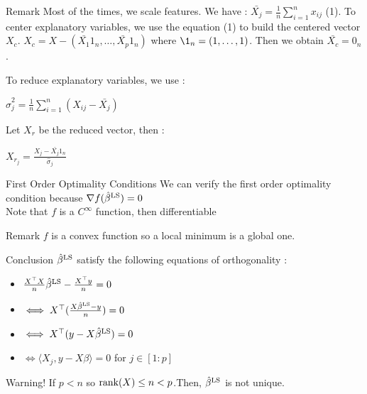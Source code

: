 \documentclass[unknownkeysallowed]{beamer}
\begin{document}
\begin{block}{Remark}
Most of the times, we scale features.
\newline
We have : $\bar{X_{j}}=\frac{1}{n} \sum\limits_{i=1}^{n} x_{ij}$ (1).
\newline
 To center explanatory variables, we use the equation (1) to build the centered vector $X_{c}$.
\newline
$X_{c} = X - (\bar{X_{1}}1_n,\dots,\bar{X_{p}}1_n)$ where $\1_n=(1,\dots,1)$.
Then we obtain $\bar{X_{c}}=0_n$.

To reduce explanatory variables, we use :
\newline
\begin{center}
$\hat\sigma_{j}^2=\frac{1}{n} \sum\limits_{i=1}^{n} (X_{ij}-\bar{X_{j}})$
\end{center}
Let $X_r$ be the reduced vector, then :
\newline
\begin{center}
$X_{r_{j}}=\frac{X_{j}-\bar{X_{j}}1_n}{\hat\sigma_{j}}$    
\end{center}

\end{block}


\begin{frame}
\begin{alertblock}{First Order Optimality Conditions}
We can verify the first order optimality condition because $\nabla{f(\hat\beta^{\rm LS})}=0$
\\
Note that $f$ is a $C^{\infty}$ function, then differentiable

\end{alertblock}

\begin{block}{Remark}
\rem $f$ is a convex function so a local minimum is a global one.
\end{block}

\begin{block}{Conclusion}
$\hat\beta^{\rm LS}$ satisfy the following equations of orthogonality :
\begin{itemize}
         \item $\frac{X^{\top}X}{n}\hat\beta^{\rm LS}-\frac{X^{\top}y}{n}=0$
        \item $\iff X^{\top}(\frac{X\hat\beta^{\rm LS}-y}{n})=0$
        \item $\iff X^{\top}(y-X\hat\beta^{\rm LS})=0$
        \item $\iff \langle X_{j},y-X\beta\rangle=0$ for $j \in [1:p]$
    \end{itemize}


\end{block}

\newpage


\begin{block}{Warning!}
If $p < n$ so ${\rm rank}(X) \leq n < p$.Then, $\hat{\beta}^{\rm LS}$ is not unique.
\end{block}


\end{frame}
\end{document}
